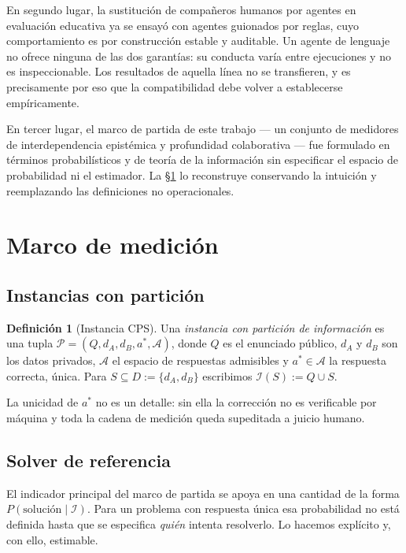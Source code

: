 \documentclass[11pt,a4paper]{article}
\theoremstyle{definition}
\newtheorem{definicion}{Definición}[section]
\theoremstyle{plain}
\theoremstyle{remark}
\newcommand{\Info}{\mathcal{I}}
\begin{document}
En segundo lugar, la sustitución de compañeros humanos por agentes en evaluación
educativa ya se ensayó con agentes guionados por reglas, cuyo comportamiento es
por construcción estable y auditable. Un agente de lenguaje no ofrece ninguna de
las dos garantías: su conducta varía entre ejecuciones y no es inspeccionable. Los
resultados de aquella línea no se transfieren, y es precisamente por eso que la
compatibilidad debe volver a establecerse empíricamente.

En tercer lugar, el marco de partida de este trabajo --- un conjunto de medidores
de interdependencia epistémica y profundidad colaborativa --- fue formulado en
términos probabilísticos y de teoría de la información sin especificar el espacio
de probabilidad ni el estimador. La §\ref{sec:marco} lo reconstruye conservando la
intuición y reemplazando las definiciones no operacionales.

\section{Marco de medición}\label{sec:marco}

\subsection{Instancias con partición}

\begin{definicion}[Instancia CPS]\label{def:instancia}
Una \emph{instancia con partición de información} es una tupla
$\mathcal{P}=(Q,d_A,d_B,a^\ast,\mathcal{A})$, donde $Q$ es el enunciado público,
$d_A$ y $d_B$ son los datos privados, $\mathcal{A}$ el espacio de respuestas
admisibles y $a^\ast\in\mathcal{A}$ la respuesta correcta, única. Para
$S\subseteq D:=\{d_A,d_B\}$ escribimos $\Info(S):=Q\cup S$.
\end{definicion}

La unicidad de $a^\ast$ no es un detalle: sin ella la corrección no es verificable
por máquina y toda la cadena de medición queda supeditada a juicio humano.

\subsection{Solver de referencia}

El indicador principal del marco de partida se apoya en una cantidad de la forma
$P(\text{solución}\mid \Info)$. Para un problema con respuesta única esa
probabilidad no está definida hasta que se especifica \emph{quién} intenta
resolverlo. Lo hacemos explícito y, con ello, estimable.
\end{document}
